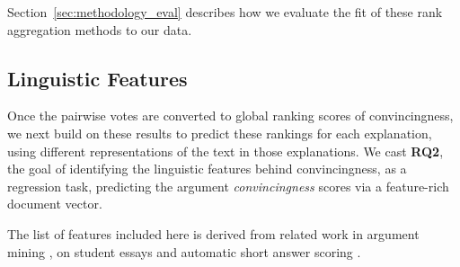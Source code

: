 \documentclass[notitlepage,12pt]{jedm}
\begin{document}
Section~\ref{sec:methodology_eval} describes how we evaluate the fit of these rank aggregation methods to our data.

\subsection{Linguistic Features}\label{sec:features}
Once the pairwise votes are converted to global ranking scores of convincingness, we next build on these results to predict these 
rankings for each explanation, using different representations of the 
text in those explanations.
We cast \textbf{RQ2}, the goal of identifying the linguistic features behind convincingness, as a regression task, predicting the argument 
\textit{convincingness} scores via a feature-rich document vector.

The list of features included here is derived from related work in argument 
mining \cite{habernal_which_2016,persing_end--end_2016}, on student 
essays and automatic short answer scoring \cite{mohler_text--text_2009}.
\end{document}
